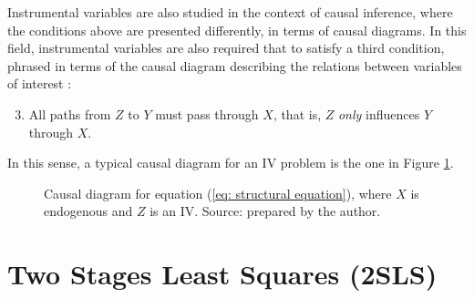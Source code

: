 Instrumental variables are also studied in the context of causal inference, where the conditions above are presented differently, in terms of causal diagrams.
In this field, instrumental variables are also required that to satisfy a third condition, phrased in terms of the causal diagram describing the relations between variables of interest \cite{hernan2020}:
\begin{enumerate}
    \setcounter{enumi}{2}
    \item All paths from $ Z $ to $ Y $ must pass through $ X $, that is, $ Z $ \emph{only} influences $ Y $ through $ X $.
\end{enumerate}
In this sense, a typical causal diagram for an IV problem is the one in Figure \ref{fig: causal diagram iv}.
\begin{figure}[t]
    \begin{center}
    \end{center}
    \caption{Causal diagram for equation (\ref{eq: structural equation}), where $ X $ is endogenous and $ Z $ is an IV.
    Source: prepared by the author.}
    \label{fig: causal diagram iv}
\end{figure}

\section{Two Stages Least Squares (2SLS)}

